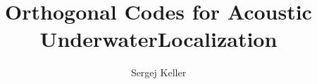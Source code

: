 \documentclass[en,abstract,acknowledgment,symbollist,inputenc=utf8]{tuhhthesis}
\author{Sergej Keller}
\title{Orthogonal Codes for Acoustic UnderwaterLocalization}
\institute{InstAutonomousCPS}
\begin{document}



%



%
%
%
%
%




\begin{tuhhappendix}
  
  
\end{tuhhappendix}


\end{document}
